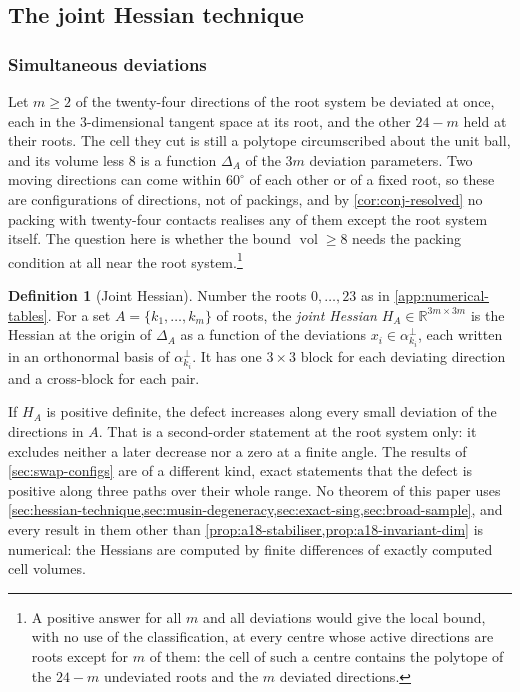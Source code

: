 \documentclass[11pt,reqno]{amsart}
\renewcommand{\_}{\origunderscore\allowbreak}
\numberwithin{equation}{section}
\theoremstyle{plain}
\theoremstyle{definition}
\newtheorem{definition}[thm]{Definition}
\theoremstyle{remark}
\newcommand{\defect}{\Delta}                 %
\DeclareMathOperator{\vol}{vol}
\begin{document}
\subsection{The joint Hessian technique}\label{sec:hessian-technique}

\subsubsection{Simultaneous deviations}

Let $m\ge2$ of the twenty-four directions of the root system be
deviated at once, each in the $3$-dimensional tangent space at its root,
and the other $24-m$ held at their roots. The cell they cut is still a
polytope circumscribed about the unit ball, and its volume less $8$ is a
function $\defect_A$ of the $3m$ deviation parameters. Two moving
directions can come within $60^\circ$ of each other or of a fixed root,
so these are configurations of directions, not of packings, and by
\cref{cor:conj-resolved} no packing with twenty-four contacts realises
any of them except the root system itself. The question here is
whether the bound $\vol\ge8$ needs the packing condition at all near
the root system.\footnote{A positive answer for all $m$ and all
deviations would give the local bound, with no use of the
classification, at every centre whose active directions are roots
except for $m$ of them: the cell of such a centre contains the polytope
of the $24-m$ undeviated roots and the $m$ deviated directions.}

\begin{definition}[Joint Hessian]\label{def:joint-hessian-new}
Number the roots $0,\dots,23$ as in \cref{app:numerical-tables}. For a
set $A=\{k_1,\dots,k_m\}$ of roots, the \emph{joint Hessian}
$H_A\in\mathbb{R}^{3m\times3m}$ is the Hessian at the origin of
$\defect_A$ as a function of the deviations $x_i\in\alpha_{k_i}^\perp$,
each written in an orthonormal basis of $\alpha_{k_i}^\perp$. It has one
$3\times3$ block for each deviating direction and a cross-block for each
pair.
\end{definition}

If $H_A$ is positive definite, the defect increases along every small
deviation of the directions in $A$. That is a second-order statement at
the root system only: it excludes neither a later decrease nor a zero
at a finite angle. The results of \cref{sec:swap-configs} are of a
different kind, exact statements that the defect is positive along
three paths over their whole range. No theorem of this paper uses
\cref{sec:hessian-technique,sec:musin-degeneracy,sec:exact-sing,sec:broad-sample},
and every result in them other than
\cref{prop:a18-stabiliser,prop:a18-invariant-dim} is numerical: the
Hessians are computed by finite differences of exactly computed cell
volumes.
\end{document}
